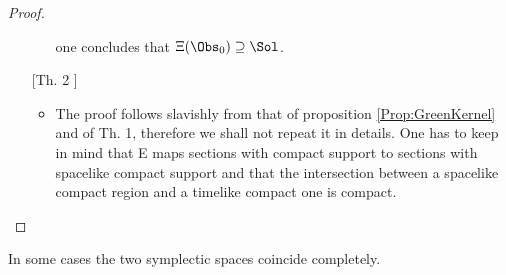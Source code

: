 \documentclass[Main]{subfiles}
\begin{document}
\begin{proof}
\begin{itemize}
\begin{itemize}
						one concludes that $\Xi ( \Obs_0) \supseteq \Sol$.
				\end{itemize}
			\item[	[Th. 2]]
				\begin{itemize}
					\item The proof follows slavishly from that of proposition \ref{Prop:GreenKernel} and of Th. 1, therefore we shall not repeat it in details. 
						One has %
						to keep in mind that E maps sections with compact support to sections with spacelike compact support and that the intersection between a spacelike compact region and a timelike compact one is compact.
				\end{itemize}		
		\end{itemize}
	\end{proof}

	In some cases the two symplectic spaces coincide completely.	
\end{document}
